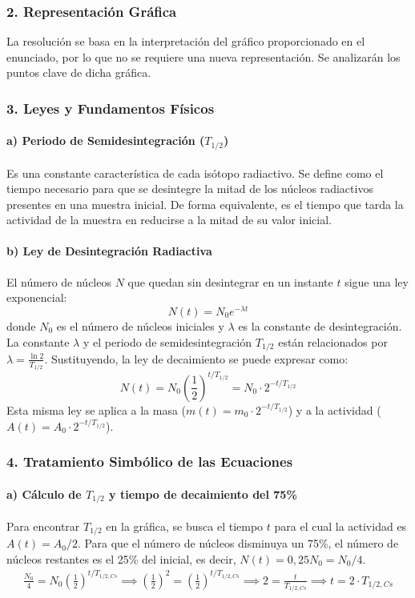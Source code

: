 \subsubsection*{2. Representación Gráfica}
La resolución se basa en la interpretación del gráfico proporcionado en el enunciado, por lo que no se requiere una nueva representación. Se analizarán los puntos clave de dicha gráfica.

\subsubsection*{3. Leyes y Fundamentos Físicos}
\paragraph*{a) Periodo de Semidesintegración ($T_{1/2}$)}
Es una constante característica de cada isótopo radiactivo. Se define como el tiempo necesario para que se desintegre la mitad de los núcleos radiactivos presentes en una muestra inicial. De forma equivalente, es el tiempo que tarda la actividad de la muestra en reducirse a la mitad de su valor inicial.

\paragraph*{b) Ley de Desintegración Radiactiva}
El número de núcleos $N$ que quedan sin desintegrar en un instante $t$ sigue una ley exponencial:
$$ N(t) = N_0 e^{-\lambda t} $$
donde $N_0$ es el número de núcleos iniciales y $\lambda$ es la constante de desintegración. La constante $\lambda$ y el periodo de semidesintegración $T_{1/2}$ están relacionados por $\lambda = \frac{\ln 2}{T_{1/2}}$. Sustituyendo, la ley de decaimiento se puede expresar como:
$$ N(t) = N_0 \left(\frac{1}{2}\right)^{t/T_{1/2}} = N_0 \cdot 2^{-t/T_{1/2}} $$
Esta misma ley se aplica a la masa ($m(t) = m_0 \cdot 2^{-t/T_{1/2}}$) y a la actividad ($A(t) = A_0 \cdot 2^{-t/T_{1/2}}$).

\subsubsection*{4. Tratamiento Simbólico de las Ecuaciones}
\paragraph*{a) Cálculo de $T_{1/2}$ y tiempo de decaimiento del 75\%}
Para encontrar $T_{1/2}$ en la gráfica, se busca el tiempo $t$ para el cual la actividad es $A(t) = A_0/2$.
Para que el número de núcleos disminuya un 75\%, el número de núcleos restantes es el 25\% del inicial, es decir, $N(t) = 0,25 N_0 = N_0/4$.
\begin{gather}
    \frac{N_0}{4} = N_0 \left(\frac{1}{2}\right)^{t/T_{1/2, Cs}} \implies \left(\frac{1}{2}\right)^2 = \left(\frac{1}{2}\right)^{t/T_{1/2, Cs}} \implies 2 = \frac{t}{T_{1/2, Cs}} \implies t = 2 \cdot T_{1/2, Cs}
\end{gather}

